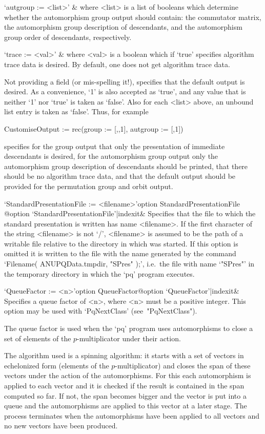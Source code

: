 \quad`autgroup := <list>' &
where  <list>  is  a  list  of  booleans  which  determine  whether   the
automorphism group output should  contain:  the  commutator  matrix,  the
automorphism group description of descendants, and the automorphism group
order of descendants, respectively.

\quad`trace := <val>' &
where <val> is a boolean which if `true' specifies algorithm  trace  data
is desired. By default, one does not get algorithm trace data.

Not providing a field (or mis-spelling it!), specifies that  the  default
output is desired. As a convenience, `1' is also accepted as `true',  and
any value that is neither `1' nor `true' is taken as  `false'.  Also  for
each <list> above, an unbound list entry is taken as `false'.  Thus,  for
example

\begintt
CustomiseOutput := rec(group := [,,1], autgroup := [,1])
\endtt

specifies for the group output that only the  presentation  of  immediate
descendants is desired,  for  the  automorphism  group  output  only  the
automorphism group description of descendants  should  be  printed,  that
there should be no algorithm trace data,  and  that  the  default  output
should be provided for the permutation group and orbit output.

\>`StandardPresentationFile := <filename>'{option StandardPresentationFile}%
@{option `StandardPresentationFile'|indexit}&
Specifies that the file to which the standard presentation is written has
name <filename>. If the first character of the string <filename>  is  not
`/', <filename> is assumed to be the path of a writable file relative  to
the directory in which {\GAP} was started. If this option is  omitted  it
is written to the file with the name generated by the command  `Filename(
ANUPQData.tmpdir, "SPres" );', i.e.~the file with name `"SPres"'  in  the
temporary directory in which the `pq' program executes.

\>`QueueFactor := <n>'{option QueueFactor}@{option `QueueFactor'|indexit}&
Specifies a queue factor of <n>,  where  <n> must  be a positive  integer.
This option may be used with `PqNextClass' (see~"PqNextClass").

The queue factor is used when the `pq' program uses automorphisms to close
a set of elements of the $p$-multiplicator under their action.

The algorithm used is a spinning algorithm:  it  starts  with  a  set  of
vectors in echelonized  form  (elements  of  the  $p$-multiplicator)  and
closes the span of these vectors under the action of  the  automorphisms.
For this each automorphism is applied to each vector and it is checked if
the result is contained in the span computed so far.  If  not,  the  span
becomes bigger and the vector is put into a queue and  the  automorphisms
are applied to this vector at a later stage. The process terminates  when
the automorphisms have been applied to all vectors  and  no  new  vectors
have been produced.

